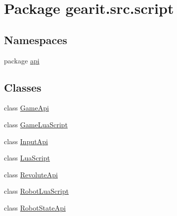 \hypertarget{namespacegearit_1_1src_1_1script}{\section{Package gearit.\+src.\+script}
\label{namespacegearit_1_1src_1_1script}
}
\subsection*{Namespaces}
\begin{DoxyCompactItemize}
\item 
package \hyperlink{namespacegearit_1_1src_1_1script_1_1api}{api}
\end{DoxyCompactItemize}
\subsection*{Classes}
\begin{DoxyCompactItemize}
\item 
class \hyperlink{classgearit_1_1src_1_1script_1_1_game_api}{Game\+Api}
\item 
class \hyperlink{classgearit_1_1src_1_1script_1_1_game_lua_script}{Game\+Lua\+Script}
\item 
class \hyperlink{classgearit_1_1src_1_1script_1_1_input_api}{Input\+Api}
\item 
class \hyperlink{classgearit_1_1src_1_1script_1_1_lua_script}{Lua\+Script}
\item 
class \hyperlink{classgearit_1_1src_1_1script_1_1_revolute_api}{Revolute\+Api}
\item 
class \hyperlink{classgearit_1_1src_1_1script_1_1_robot_lua_script}{Robot\+Lua\+Script}
\item 
class \hyperlink{classgearit_1_1src_1_1script_1_1_robot_state_api}{Robot\+State\+Api}
\end{DoxyCompactItemize}
